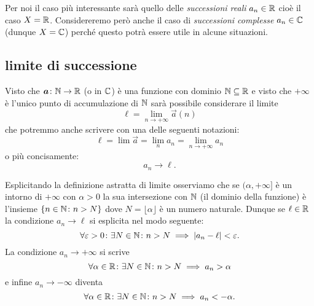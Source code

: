 Per noi il caso più interessante sarà quello delle \emph{successioni reali}
$a_n\in {\mathbb R}$ cioè il caso $X={\mathbb R}$. Considereremo però anche il caso di
\emph{successioni complesse} $a_n\in {\mathbb C}$ (dunque $X={\mathbb C}$) perché questo
potrà essere utile in alcune situazioni.%

\subsection{limite di successione}

Visto che $\boldsymbol a \colon {\mathbb N}\to{\mathbb R}$ (o in ${\mathbb C}$) è una funzione 
con dominio ${\mathbb N}\subseteq {\mathbb R}$ 
e visto che $+\infty$ è l'unico punto di accumulazione di ${\mathbb N}$ 
sarà possibile considerare il limite
\[
  \ell = \lim_{n\to +\infty} \vec a(n)
\]
che potremmo anche scrivere con una delle seguenti notazioni:
\[
\ell = \lim \vec a = \lim_n a_n = \lim_{n\to +\infty} a_n
\]
o più concisamente:
\[
  a_n \to \ell. 
\]

Esplicitando la definizione astratta di limite osserviamo che se $(\alpha,+\infty]$
è un intorno di $+\infty$ con $\alpha>0$ la sua intersezione con ${\mathbb N}$ (il dominio della funzione)
è l'insieme ${\left\{ n\in {\mathbb N}\colon n> N \right\}}$ dove $N=\lfloor \alpha \rfloor$ è 
un numero naturale. Dunque se $\ell \in {\mathbb R}$ 
la condizione $a_n \to \ell$ si esplicita nel modo seguente:
\begin{equation}\label{eq:limite_successione_convergente}
\forall \varepsilon>0\colon \exists N\in {\mathbb N}\colon n>N\implies {\left|a_n-\ell\right|} < \varepsilon.  
\end{equation}
La condizione $a_n\to +\infty$ si scrive
\[
  \forall \alpha\in {\mathbb R} \colon \exists N\in {\mathbb N} \colon n>N \implies a_n > \alpha  
\]
e infine $a_n\to-\infty$ diventa
\[
  \forall \alpha\in {\mathbb R} \colon \exists N\in {\mathbb N} \colon n>N \implies a_n < -\alpha.    
\]

